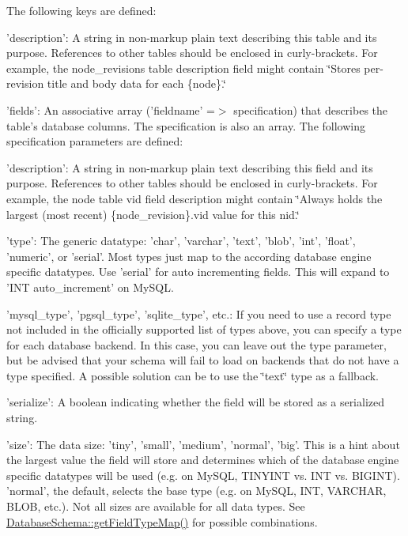 The following keys are defined:
\begin{DoxyItemize}
\item 'description': A string in non-\/markup plain text describing this table and its purpose. References to other tables should be enclosed in curly-\/brackets. For example, the node\_\-revisions table description field might contain \char`\"{}Stores per-\/revision title and
     body data for each \{node\}.\char`\"{}
\item 'fields': An associative array ('fieldname' =$>$ specification) that describes the table's database columns. The specification is also an array. The following specification parameters are defined:
\begin{DoxyItemize}
\item 'description': A string in non-\/markup plain text describing this field and its purpose. References to other tables should be enclosed in curly-\/brackets. For example, the node table vid field description might contain \char`\"{}Always holds the largest (most
       recent) \{node\_\-revision\}.vid value for this nid.\char`\"{}
\item 'type': The generic datatype: 'char', 'varchar', 'text', 'blob', 'int', 'float', 'numeric', or 'serial'. Most types just map to the according database engine specific datatypes. Use 'serial' for auto incrementing fields. This will expand to 'INT auto\_\-increment' on MySQL.
\item 'mysql\_\-type', 'pgsql\_\-type', 'sqlite\_\-type', etc.: If you need to use a record type not included in the officially supported list of types above, you can specify a type for each database backend. In this case, you can leave out the type parameter, but be advised that your schema will fail to load on backends that do not have a type specified. A possible solution can be to use the \char`\"{}text\char`\"{} type as a fallback.
\item 'serialize': A boolean indicating whether the field will be stored as a serialized string.
\item 'size': The data size: 'tiny', 'small', 'medium', 'normal', 'big'. This is a hint about the largest value the field will store and determines which of the database engine specific datatypes will be used (e.g. on MySQL, TINYINT vs. INT vs. BIGINT). 'normal', the default, selects the base type (e.g. on MySQL, INT, VARCHAR, BLOB, etc.). Not all sizes are available for all data types. See \hyperlink{classDatabaseSchema_a82022c76c3131c4d745736d08321b788}{DatabaseSchema::getFieldTypeMap()} for possible combinations.

\end{DoxyItemize}
\end{DoxyItemize}
